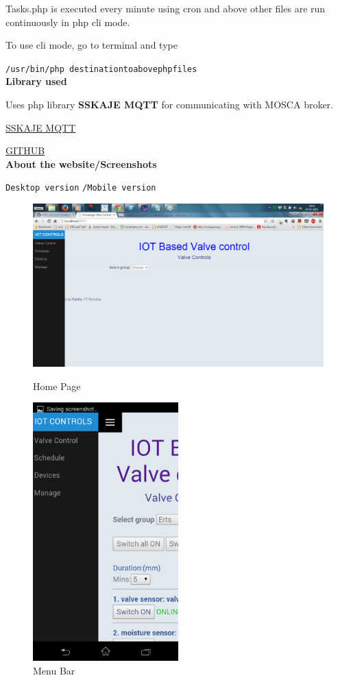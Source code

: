 \documentclass[16pt]{article}
\begin{document}
Tasks.php is executed every minute using cron and above other files are
run continuously in php cli mode.

To use cli mode, go to terminal and type

\texttt{/usr/bin/php destinationtoabovephpfiles}\\

\textbf{Library used}

Uses php library \textbf{SSKAJE MQTT} for communicating with MOSCA
broker.

\href{https://sskaje.me}{SSKAJE MQTT}

\href{https://github.com/sskaje/mqtt}{GITHUB}\\
\textbf{About the website/Screenshots}

\texttt{Desktop version} \texttt{/Mobile version}

	\begin{figure}
		\includegraphics[width=1.2\textwidth]{images/homepage.png}
		\caption{Home Page}
			\includegraphics[width=0.5\textwidth]{images/menu.png}
			\caption{Menu Bar}
		
	\end{figure}
	
\end{document}
